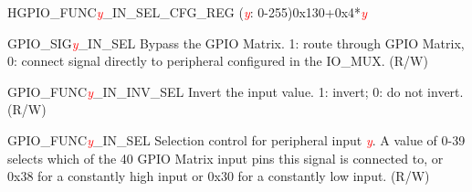 \begin{register}{H}{GPIO\_FUNC\textcolor{red}{\it{y}}\_IN\_SEL\_CFG\_REG (\textcolor{red}{\it{y}}: 0-255)}{0x130+0x4*\textcolor{red}{\it{y}}}\label{regdesc:GPIOFUNCnINSELCFGREG}
%
%
%
%
\regnewline%
\begin{regdesc}\begin{reglist}
\item [GPIO\_SIG\textcolor{red}{\it{y}}\_IN\_SEL]Bypass the GPIO Matrix. 1: route through GPIO Matrix, 0: connect signal directly to peripheral configured in the IO\_MUX. (R/W)
\item [GPIO\_FUNC\textcolor{red}{\it{y}}\_IN\_INV\_SEL]Invert the input value. 1: invert; 0: do not invert. (R/W)
\item [GPIO\_FUNC\textcolor{red}{\it{y}}\_IN\_SEL]Selection control for peripheral input \textcolor{red}{\it{y}}. A value of 0-39 selects which of the 40 GPIO Matrix input pins this signal is connected to, or 0x38 for a constantly high input or 0x30 for a constantly low input. (R/W)
\end{reglist}\end{regdesc}
\end{register}


